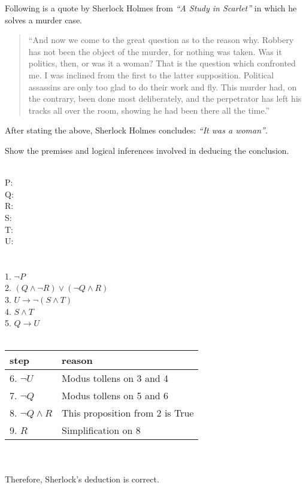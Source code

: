 \documentclass[a4paper]{exam}
\begin{document}
\begin{questions}
\begin{solution}
  \end{solution}

  \question Following is a quote by Sherlock Holmes from \textit{“A Study in Scarlet”} in which he solves a murder case.
\begin{quote}
``And now we come to the great question as to the reason why. Robbery has not been the object of the murder, for nothing was taken. Was it politics, then, or was it a woman? That is the question which confronted me. I was inclined from the first to the latter supposition. Political assassins are only too glad to do their work and fly. This murder had, on the contrary, been done most deliberately, and the perpetrator has left his tracks all over the room, showing he had been there all the time.''
\end{quote}
After stating the above, Sherlock Holmes concludes: \textit{``It was a woman''}.

Show the premises and logical inferences involved in deducing the conclusion.

  \begin{solution}\\
    P:  \\
    Q:  \\
    R:  \\
    S:  \\
    T:  \\
    U:  \\
    \\
     \\
    1. $\neg P$ \\
    2. $(Q \land \neg R) \lor (\neg Q \land R)$ \\
    3. $U \rightarrow \neg (S \land T)$ \\
    4. $S \land T$ \\
    5. $Q \rightarrow U$ \\
    \\
    \begin{tabular}{|l|l|}
      \hline
      step & reason\\
      \hline
      6. $\neg U$ & Modus tollens on 3 and 4\\
      7. $\neg Q$ & Modus tollens on 5 and 6\\
      8. $\neg Q \land R$ & This proposition from 2 is True\\
      9. $R$ & Simplification on 8\\
      \hline
    \end{tabular}\\\\
    Therefore, Sherlock's deduction is correct.



\end{solution}
\end{questions}
\end{document}

